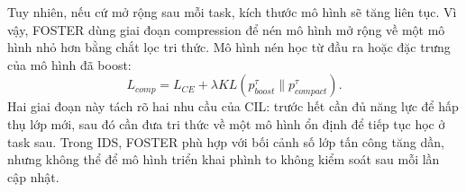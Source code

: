 Tuy nhiên, nếu cứ mở rộng sau mỗi task, kích thước mô hình sẽ tăng liên tục. Vì vậy, FOSTER dùng giai đoạn compression để nén mô hình mở rộng về một mô hình nhỏ hơn bằng chắt lọc tri thức. Mô hình nén học từ đầu ra hoặc đặc trưng của mô hình đã boost:
$$
L_{comp}=L_{CE}+\lambda KL(p_{boost}^{\tau}\|p_{compact}^{\tau}).
$$
Hai giai đoạn này tách rõ hai nhu cầu của CIL: trước hết cần đủ năng lực để hấp thụ lớp mới, sau đó cần đưa tri thức về một mô hình ổn định để tiếp tục học ở task sau. Trong IDS, FOSTER phù hợp với bối cảnh số lớp tấn công tăng dần, nhưng không thể để mô hình triển khai phình to không kiểm soát sau mỗi lần cập nhật.





